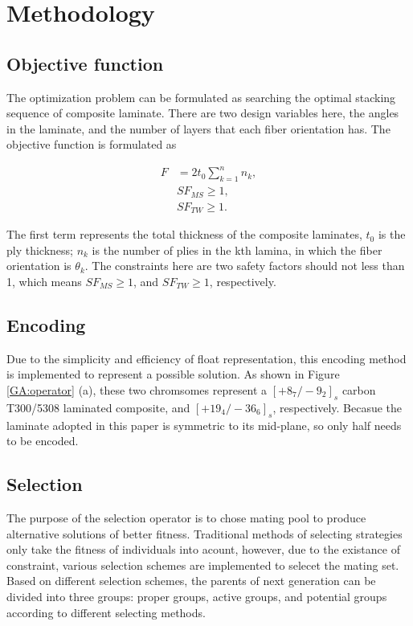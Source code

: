 \section{Methodology}
\subsection{Objective function}
The optimization problem can be formulated as searching the optimal stacking
sequence of composite laminate.  There are two design variables here, the angles
in the laminate, and the number of layers that each fiber orientation has. The
objective function is formulated as

\begin{equation}
	\begin{split}
    	F  &= 2t_0 \sum_{k=1}^n n_k  \textstyle{,}\\
    	   &SF_{MS} \geq 1 \textstyle{,} \\
    	   &SF_{TW} \geq 1 \textstyle{.}
	\end{split} 
\end{equation}

The first term represents the total thickness of the composite laminates, $t_0$
is the ply thickness; $n_k$ is the number of plies in the kth lamina, in which
the fiber orientation is $\theta_k$. The constraints here are two safety
factors should not less than 1, which means  $SF_{MS} \geq 1$, and $SF_{TW} \geq
1$, respectively.

\subsection{Encoding}
Due to the simplicity and efficiency of float representation, this encoding
method is implemented to represent a possible solution. As shown in Figure \ref{GA:operator}
 (a), these two chromsomes represent a $[+8_{7}/-9_{2}]_s$
carbon T300/5308 laminated composite, and $[+19_{4}/-36_{6}]_s$, respectively.
Becasue the laminate adopted in this paper is symmetric to its mid-plane, so
only half needs to be encoded.

\subsection{Selection}
The purpose of the selection operator is to chose mating pool to produce
alternative solutions of better fitness. Traditional methods of selecting
strategies only take the fitness of individuals into acount, however, due to 
the existance of constraint, various selection schemes are implemented to
selecet the mating set. Based on different selection schemes, the parents of
next generation can be divided into  three groups: proper groups, active groups,
and potential groups according to different selecting methods. 

